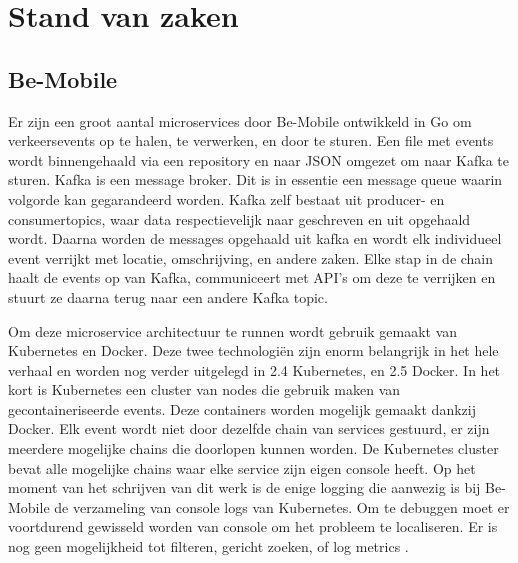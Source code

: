 \chapter{Stand van zaken}
\label{ch:stand-van-zaken}


\section{Be-Mobile}
\label{sec:Be-Mobile}
Er zijn een groot aantal microservices door Be-Mobile ontwikkeld in Go om verkeersevents op te halen, te verwerken, en door te sturen. Een file met events wordt binnengehaald via een repository en naar JSON omgezet om naar Kafka te sturen. Kafka is een message broker. Dit is in essentie een message queue waarin volgorde kan gegarandeerd worden. Kafka zelf bestaat uit producer- en consumertopics, waar data respectievelijk naar geschreven en uit opgehaald wordt. Daarna worden de messages opgehaald uit kafka en wordt elk individueel event verrijkt met locatie, omschrijving, en andere zaken. Elke stap in de chain haalt de events op van Kafka, communiceert met API's om deze te verrijken en stuurt ze daarna terug naar een andere Kafka topic.

Om deze microservice architectuur te runnen wordt gebruik gemaakt van Kubernetes en Docker. Deze twee technologiën zijn enorm belangrijk in het hele verhaal en worden nog verder uitgelegd in 2.4 Kubernetes, en 2.5 Docker. In het kort is Kubernetes een cluster van nodes die gebruik maken van gecontaineriseerde events. Deze containers worden mogelijk gemaakt dankzij Docker. Elk event wordt niet door dezelfde chain van services gestuurd, er zijn meerdere mogelijke chains die doorlopen kunnen worden. De Kubernetes cluster bevat alle mogelijke chains waar elke service zijn eigen console heeft. Op het moment van het schrijven van dit werk is de enige logging die aanwezig is bij Be-Mobile de verzameling van console logs van Kubernetes. Om te debuggen moet er voortdurend gewisseld worden van console om het probleem te localiseren. Er is nog geen mogelijkheid tot filteren, gericht zoeken, of log metrics \autocite{jens2019}.

